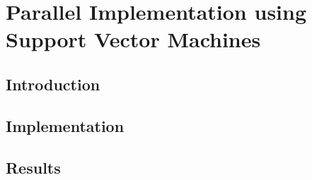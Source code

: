 \chapter{Parallel Implementation using Support Vector Machines}
\section{Introduction}
\section{Implementation}
\section{Results}

